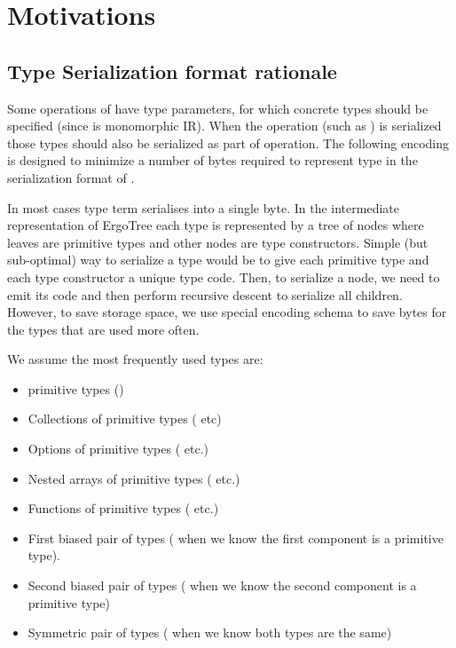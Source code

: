\section{Motivations}
\label{sec:appendix:motivation}

\subsection{Type Serialization format rationale}
\label{sec:appendix:motivation:type}

Some operations of \ASDag have type parameters, for which concrete types
should be specified (since \ASDag is monomorphic IR). When the operation
(such as \hyperref[sec:serialization:operation:ExtractRegisterAs]{}) is serialized those types should also be
serialized as part of operation. The following encoding is designed to
minimize a number of bytes required to represent type in the serialization
format of \ASDag.

In most cases type term serialises into a single byte. In the intermediate
representation of ErgoTree each type is represented by a tree of nodes where
leaves are primitive types and other nodes are type constructors.
Simple (but sub-optimal) way to serialize a type would be to give each
primitive type and each type constructor a unique type code. Then, to
serialize a node, we need to emit its code and then perform recursive descent
to serialize all children. 
However, to save storage space, we use special encoding schema to save bytes
for the types that are used more often.

We assume the most frequently used types are:
\begin{itemize}
    \item primitive types ()
    \item  Collections of primitive types ( etc)
    \item  Options of primitive types ( etc.)
    \item Nested arrays of primitive types ( etc.)
    \item Functions of primitive types ( etc.)
    \item First biased pair of types ( when we know the first
    component is a primitive type).
    \item Second biased pair of types ( when we know the second
    component is a primitive type)
    \item Symmetric pair of types ( when we know both types are
    the same)
\end{itemize}

